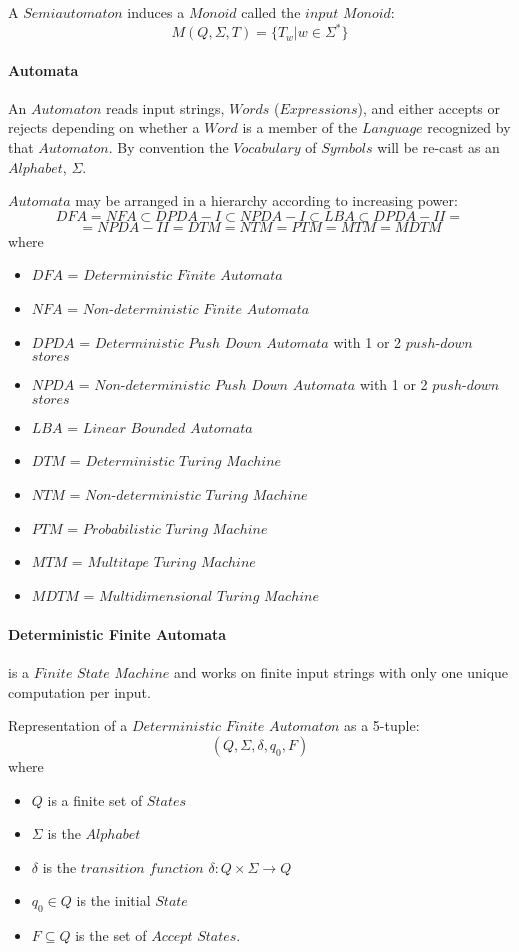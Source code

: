 \documentclass{article}
\begin{document}
    A $Semiautomaton$ induces a $Monoid$ called the $input$ $Monoid$:
    \[
        M(Q,\Sigma,T) = \{T_w | w \in \Sigma^*\}
    \]

    \paragraph{Automata}

    An $Automaton$ reads input strings, $Words$ ($Expressions$), and
    either accepts or rejects depending on whether a $Word$ is a
    member of the $Language$ recognized by that $Automaton$. By
    convention the $Vocabulary$ of $Symbols$ will be re-cast as an
    $Alphabet$, $\Sigma$.

    $Automata$ may be arranged in a hierarchy according to increasing power:
    \[
        DFA = NFA \subset DPDA-I \subset NPDA-I \subset LBA \subset DPDA-II =
    \]\[
        = NPDA-II = DTM = NTM = PTM = MTM = MDTM
    \]
    where
    \begin{itemize}
    \item $DFA$ = $Deterministic$ $Finite$ $Automata$
    \item $NFA$ = $Non$-$deterministic$ $Finite$ $Automata$
    \item $DPDA$ = $Deterministic$ $Push$ $Down$ $Automata$ with 1
      or 2 $push$-$down$ $stores$
    \item $NPDA$ = $Non$-$deterministic$ $Push$ $Down$ $Automata$
      with 1 or 2 $push$-$down$ $stores$
    \item $LBA$ = $Linear$ $Bounded$ $Automata$
    \item $DTM$ = $Deterministic$ $Turing$ $Machine$
    \item $NTM$ = $Non$-$deterministic$ $Turing$ $Machine$
    \item $PTM$ = $Probabilistic$ $Turing$ $Machine$
    \item $MTM$ = $Multitape$ $Turing$ $Machine$
    \item $MDTM$ = $Multidimensional$ $Turing$ $Machine$
    \end{itemize}

    \paragraph{Deterministic Finite Automata} is a $Finite$ $State$
    $Machine$ and works on finite input strings with only one unique
    computation per input.

    Representation of a $Deterministic$ $Finite$ $Automaton$ as a 5-tuple:
    \[
        (Q,\Sigma,\delta,q_0,F)
    \]
    where
    \begin{itemize}
    \item $Q$ is a finite set of $States$
    \item $\Sigma$ is the $Alphabet$
    \item $\delta$ is the $transition$ $function$ $\delta: Q \times
      \Sigma \rightarrow Q$
    \item $q_0 \in Q$ is the initial $State$
    \item $F \subseteq Q$ is the set of $Accept$ $States$.
    \end{itemize}
\end{document}

